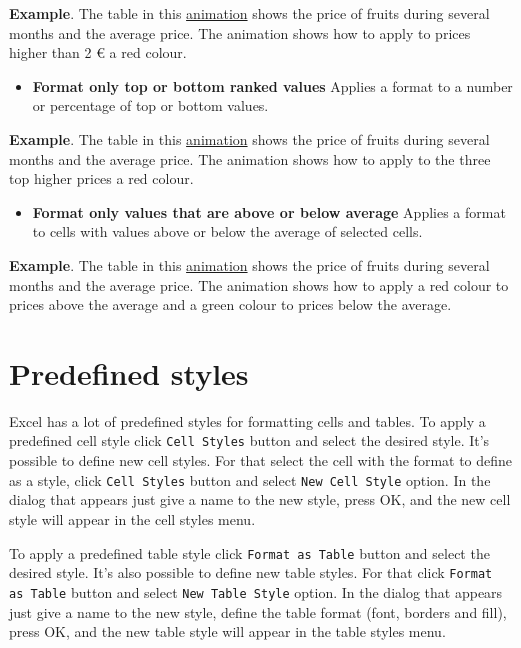 \textbf{Example}. The table in this \href{http://aprendeconalf.es/office/excel/manual/img/example_conditional_formatting_logical_condition.gif}{animation} shows the price of fruits during several months and the average price. The animation shows how to apply to prices higher than 2 € a red colour.

\begin{itemize}
\item \textbf{Format only top or bottom ranked values} Applies a format to a number or percentage of top or bottom values.
\end{itemize}

\textbf{Example}. The table in this \href{http://aprendeconalf.es/office/excel/manual/img/example_conditional_formatting_top_values.gif}{animation} shows the price of fruits during several months and the average price. The animation shows how to apply to the three top higher prices a red colour.

\begin{itemize}
\item \textbf{Format only values that are above or below average} Applies a format to cells with values above or below the average of selected cells.
\end{itemize}

\textbf{Example}. The table in this \href{http://aprendeconalf.es/office/excel/manual/img/example_conditional_formatting_average.gif}{animation} shows the price of fruits during several months and the average price. The animation shows how to apply a red colour to prices above the average and a green colour to prices below the average.

\section{Predefined styles}\hypertarget{predefined-styles}{}\label{predefined-styles}

Excel has a lot of predefined styles for formatting cells and tables. To apply a predefined cell style click
\texttt{Cell Styles} button and select the desired style. It's possible to define new cell styles. For that select the
cell with the format to define as a style, click \texttt{Cell Styles} button and select \texttt{New Cell Style}
option. In the dialog that appears just give a name to the new style, press OK, and the new cell style will appear in
the cell styles menu.

To apply a predefined table style click \texttt{Format as Table} button and select the desired style. It's also possible
to define new table styles. For that click \texttt{Format as Table} button and select \texttt{New Table Style} option.
In the dialog that appears just give a name to the new style, define the table format (font, borders and fill), press OK,
and the new table style will appear in the table styles menu.

